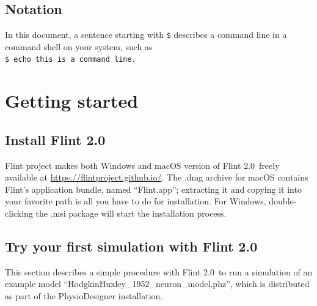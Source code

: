 \documentclass[a4paper,10pt]{report}
\def\FlintVersion{2.0}
\def\Flint{Flint \FlintVersion}
\begin{document}
\section{Notation}
In this document, a sentence starting with {\tt \$} describes a command line in
a command shell on your system, such as\\
{\tt \$ echo this is a command line.}



\chapter{Getting started}

\section{Install \Flint}
Flint project makes both Windows and macOS version of \Flint\ freely
available at \url{https://flintproject.github.io/}.
The .dmg archive for macOS contains Flint's application bundle, named
``Flint.app''; extracting it and copying it into your favorite path is all
you have to do for installation.
For Windows, double-clicking the .msi package will start the installation
process.

\section{Try your first simulation with \Flint}
This section describes a simple procedure with \Flint\ to run a simulation of an
example model ``HodgkinHuxley\_1952\_neuron\_model.phz'', which is distributed
as part of the PhysioDesigner \cite{PhysioDesigner} installation.
\end{document}
